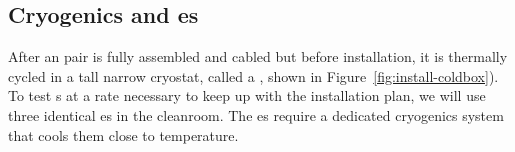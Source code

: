 \subsection{Cryogenics and \coldbox{}es}
\label{sec:fdsp-tc-infr-cryo}



After an  pair is fully assembled and cabled but before installation, it is thermally cycled  %
in a tall narrow cryostat, called a \coldbox{}, shown in Figure~\ref{fig:install-coldbox}). To test s at a rate necessary to keep up with the installation plan, we will use three identical \coldbox{}es in the cleanroom. The \coldbox{}es require a dedicated cryogenics system that cools them  close to  temperature. 




